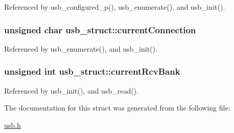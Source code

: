 Referenced by usb\_\-configured\_\-p(), usb\_\-enumerate(), and usb\_\-init().\hypertarget{structusb__struct_dae69c084e8a095ac39d815bcb30f3ed}{
\subsubsection{\setlength{\rightskip}{0pt plus 5cm}unsigned char {\bf usb\_\-struct::currentConnection}}}
\label{structusb__struct_dae69c084e8a095ac39d815bcb30f3ed}




Referenced by usb\_\-enumerate(), and usb\_\-init().\hypertarget{structusb__struct_281ada4c65e5363e29d3a96947dce4da}{
\subsubsection{\setlength{\rightskip}{0pt plus 5cm}unsigned int {\bf usb\_\-struct::currentRcvBank}}}
\label{structusb__struct_281ada4c65e5363e29d3a96947dce4da}




Referenced by usb\_\-init(), and usb\_\-read().

The documentation for this struct was generated from the following file:\begin{CompactItemize}
\item 
\hyperlink{usb_8h}{usb.h}\end{CompactItemize}
